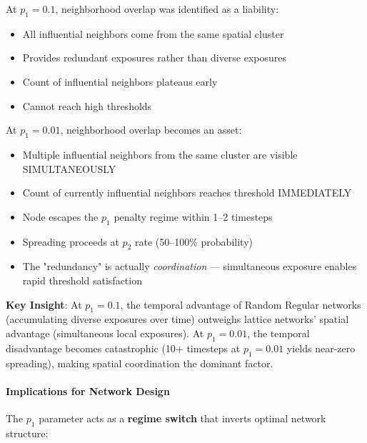 \documentclass[12pt,a4paper]{article}
\begin{document}
At $p_1=0.1$, neighborhood overlap was identified as a liability:
\begin{itemize}
    \item All influential neighbors come from the same spatial cluster
    \item Provides redundant exposures rather than diverse exposures
    \item Count of influential neighbors plateaus early
    \item Cannot reach high thresholds
\end{itemize}

At $p_1=0.01$, neighborhood overlap becomes an asset:
\begin{itemize}
    \item Multiple influential neighbors from the same cluster are visible SIMULTANEOUSLY
    \item Count of currently influential neighbors reaches threshold IMMEDIATELY
    \item Node escapes the $p_1$ penalty regime within 1--2 timesteps
    \item Spreading proceeds at $p_2$ rate (50--100\% probability)
    \item The "redundancy" is actually \textit{coordination} --- simultaneous exposure enables rapid threshold satisfaction
\end{itemize}

\textbf{Key Insight}: At $p_1=0.1$, the temporal advantage of Random Regular networks (accumulating diverse exposures over time) outweighs lattice networks' spatial advantage (simultaneous local exposures). At $p_1=0.01$, the temporal disadvantage becomes catastrophic (10+ timesteps at $p_1=0.01$ yields near-zero spreading), making spatial coordination the dominant factor.

\paragraph{Implications for Network Design}

The $p_1$ parameter acts as a \textbf{regime switch} that inverts optimal network structure:
\end{document}
